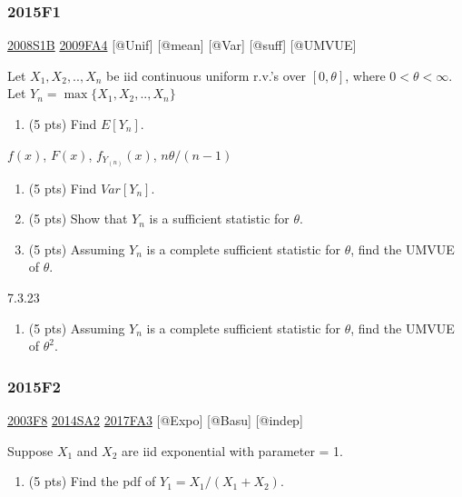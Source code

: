 \documentclass[6pt,twocolumn,Portrait]{article}
\providecommand{\tightlist}{%
  \setlength{\itemsep}{0pt}\setlength{\parskip}{0pt}}
\begin{document}
\hypertarget{f1-5}{%
\subsubsection{2015F1}\label{f1-5}}

\protect\hyperlink{s1b}{2008S1B} \protect\hyperlink{fa4}{2009FA4}
{[}@Unif{]} {[}@mean{]} {[}@Var{]} {[}@suff{]} {[}@UMVUE{]}

Let \(X_1,X_2,..,X_{n}\) be iid continuous uniform r.v.'s over
\([0,\theta]\), where \(0 <\theta<\infty\). Let
\(Y_{n}=\max\{X_1,X_2,..,X_{n}\}\)

\begin{enumerate}
\def\labelenumi{(\alph{enumi})}
\tightlist
\item
  (5 pts) Find \(E[Y_n]\).
\end{enumerate}

\(f(x)\), \(F(x)\), \(f_{Y_{(n)}}(x)\), \(n\theta/(n-1)\)

\begin{enumerate}
\def\labelenumi{(\alph{enumi})}
\setcounter{enumi}{1}
\item
  (5 pts) Find \(Var[Y_n]\).
\item
  (5 pts) Show that \(Y_n\) is a sufficient statistic for \(\theta\).
\item
  (5 pts) Assuming \(Y_n\) is a complete sufficient statistic for
  \(\theta\), find the UMVUE of \(\theta\).
\end{enumerate}

7.3.23

\begin{enumerate}
\def\labelenumi{(\alph{enumi})}
\setcounter{enumi}{4}
\tightlist
\item
  (5 pts) Assuming \(Y_n\) is a complete sufficient statistic for
  \(\theta\), find the UMVUE of \(\theta^2\).
\end{enumerate}

\hypertarget{f2-5}{%
\subsubsection{2015F2}\label{f2-5}}

\protect\hyperlink{f8-1}{2003F8} \protect\hyperlink{sa2-2}{2014SA2}
\protect\hyperlink{fa3-3}{2017FA3} {[}@Expo{]} {[}@Basu{]} {[}@indep{]}

Suppose \(X_1\) and \(X_2\) are iid exponential with parameter = 1.

\begin{enumerate}
\def\labelenumi{(\alph{enumi})}
\tightlist
\item
  (5 pts) Find the pdf of \(Y_1=X_1/(X_1+X_2)\).
\end{enumerate}
\end{document}
